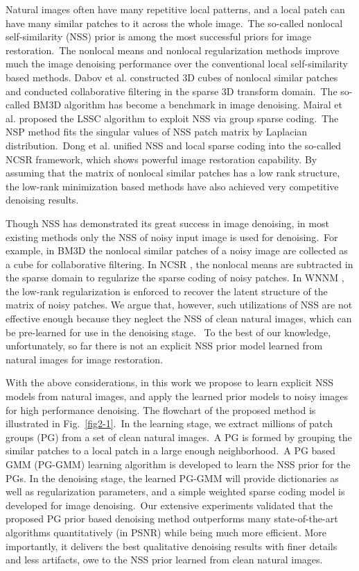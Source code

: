 Natural images often have many repetitive local patterns, and a local patch can have many similar patches to it across the whole image.\ The so-called nonlocal self-similarity (NSS) prior is among the most successful priors for image restoration.\ The nonlocal means \cite{nlm} and nonlocal regularization \cite{nlr} methods improve much the image denoising performance over the conventional local self-similarity based methods. Dabov et al. \cite{bm3d} constructed 3D cubes of nonlocal similar patches and conducted collaborative filtering in the sparse 3D transform domain.\ The so-called BM3D algorithm has become a benchmark in image denoising. Mairal et al. \cite{lssc} proposed the LSSC algorithm to exploit NSS via group sparse coding.\ The NSP \cite{nsp} method fits the singular values of NSS patch matrix by Laplacian distribution.\ Dong et al. \cite{ncsr} unified NSS and local sparse coding into the so-called NCSR framework, which shows powerful image restoration capability. By assuming that the matrix of nonlocal similar patches has a low rank structure, the low-rank minimization based methods \cite{nnm,wnnm} have also achieved very competitive denoising results. 

Though NSS has demonstrated its great success in image denoising, in most existing methods only the NSS of noisy input image is used for denoising.\ For example, in BM3D \cite{bm3d} the nonlocal similar patches of a noisy image are collected as a cube for collaborative filtering. In NCSR \cite{ncsr}, the nonlocal means are subtracted in the sparse domain to regularize the sparse coding of noisy patches. In WNNM \cite{wnnm}, the low-rank regularization is enforced to recover the latent structure of the matrix of noisy patches. We argue that, however, such utilizations of NSS are not effective enough because they neglect the NSS of clean natural images, which can be pre-learned for use in the denoising stage. \ To the best of our knowledge, unfortunately, so far there is not an explicit NSS prior model learned from natural images for image restoration. 

With the above considerations, in this work we propose to learn explicit NSS models from natural images, and apply the learned prior models to noisy images for high performance denoising. The flowchart of the proposed method is illustrated in Fig.\ \ref{fig2-1}.\ In the learning stage, we extract millions of patch groups (PG) from a set of clean natural images.\ A PG is formed by grouping the similar patches to a local patch in a large enough neighborhood.\ A PG based GMM (PG-GMM) learning algorithm is developed to learn the NSS prior for the PGs. In the denoising stage, the learned PG-GMM will provide dictionaries as well as regularization parameters, and a simple weighted sparse coding model is developed for image denoising.\ Our extensive experiments validated that the proposed PG prior based denoising method outperforms many state-of-the-art algorithms quantitatively (in PSNR) while being much more efficient. More importantly, it delivers the best qualitative denoising results with finer details and less artifacts, owe to the NSS prior learned from clean natural images.   

